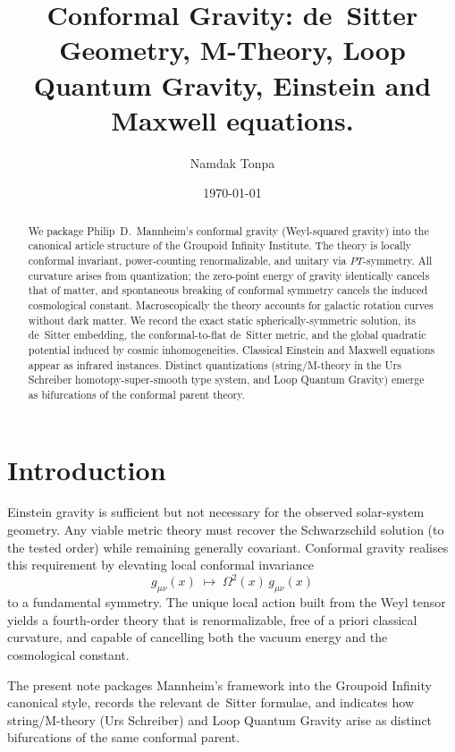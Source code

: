 \documentclass{article}
\title{Conformal Gravity: de~Sitter Geometry, M-Theory, Loop Quantum Gravity, Einstein and Maxwell equations. }
\author{Namdak Tonpa}
\date{\today}
\begin{document}
\maketitle

\begin{abstract}
We package Philip~D.\ Mannheim's conformal gravity (Weyl-squared gravity) into the canonical article structure of the Groupoid Infinity Institute. The theory is locally conformal invariant, power-counting renormalizable, and unitary via \(PT\)-symmetry. All curvature arises from quantization; the zero-point energy of gravity identically cancels that of matter, and spontaneous breaking of conformal symmetry cancels the induced cosmological constant. Macroscopically the theory accounts for galactic rotation curves without dark matter. We record the exact static spherically-symmetric solution, its de~Sitter embedding, the conformal-to-flat de~Sitter metric, and the global quadratic potential induced by cosmic inhomogeneities. Classical Einstein and Maxwell equations appear as infrared instances. Distinct quantizations (string/M-theory in the Urs Schreiber homotopy-super-smooth type system, and Loop Quantum Gravity) emerge as bifurcations of the conformal parent theory.
\end{abstract}

\newpage

\ifincludeTOC
  \tableofcontents
\fi

\newpage

\section{Introduction}
\label{sec:intro}

Einstein gravity is sufficient but not necessary for the observed solar-system geometry. Any viable metric theory must recover the Schwarzschild solution (to the tested order) while remaining generally covariant. Conformal gravity realises this requirement by elevating local conformal invariance
\[
g_{\mu\nu}(x)\;\mapsto\;\Omega^2(x)\,g_{\mu\nu}(x)
\]
to a fundamental symmetry. The unique local action built from the Weyl tensor yields a fourth-order theory that is renormalizable, free of a priori classical curvature, and capable of cancelling both the vacuum energy and the cosmological constant.

The present note packages Mannheim's framework \cite{mannheim2011,mannheim1990} into the Groupoid Infinity canonical style, records the relevant de~Sitter formulae, and indicates how string/M-theory (Urs Schreiber) and Loop Quantum Gravity arise as distinct bifurcations of the same conformal parent.
\end{document}
